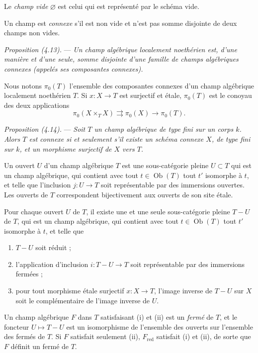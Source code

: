 \documentclass[10pt]{article}
\begin{document}
Le \emph{champ vide} $\varnothing$ est celui qui est représenté par le schéma vide.

Un champ est \emph{connexe} s'il est non vide et n'est pas somme disjointe de deux champs non vides.

\medskip
\noindent\emph{Proposition (4.13).} --- \emph{Un champ algébrique localement noethérien est, d'une manière et d'une seule, somme disjointe d'une famille de champs algébriques connexes (appelés ses composantes connexes).}

Nous notons $\pi_0(T)$ l'ensemble des composantes connexes d'un champ algébrique localement noethérien $T$. Si $x:X\to T$ est surjectif et étale, $\pi_0(T)$ est le conoyau des deux applications
\[
\pi_0(X\times_T X)\rightrightarrows \pi_0(X)\longrightarrow \pi_0(T).
\]

\medskip
\noindent\emph{Proposition (4.14).} --- \emph{Soit $T$ un champ algébrique de type fini sur un corps $k$. Alors $T$ est connexe si et seulement s'il existe un schéma connexe $X$, de type fini sur $k$, et un morphisme surjectif de $X$ vers $T$.}

Un ouvert $U$ d'un champ algébrique $T$ est une sous-catégorie pleine $U\subset T$ qui est un champ algébrique, qui contient avec tout $t\in\operatorname{Ob}(T)$ tout $t'$ isomorphe à $t$, et telle que l'inclusion $j:U\to T$ soit représentable par des immersions ouvertes. Les ouverts de $T$ correspondent bijectivement aux ouverts de son site étale.

Pour chaque ouvert $U$ de $T$, il existe une et une seule sous-catégorie pleine $T-U$ de $T$, qui est un champ algébrique, qui contient avec tout $t\in\operatorname{Ob}(T)$ tout $t'$ isomorphe à $t$, et telle que
\begin{enumerate}[label=(\roman*)]
\item $T-U$ soit réduit ;
\item l'application d'inclusion $i:T-U\to T$ soit représentable par des immersions fermées ;
\item pour tout morphisme étale surjectif $x:X\to T$, l'image inverse de $T-U$ sur $X$ soit le complémentaire de l'image inverse de $U$.
\end{enumerate}

Un champ algébrique $F$ dans $T$ satisfaisant (i) et (ii) est un \emph{fermé} de $T$, et le foncteur $U\mapsto T-U$ est un isomorphisme de l'ensemble des ouverts sur l'ensemble des fermés de $T$. Si $F$ satisfait seulement (ii), $F_{\mathrm{red}}$ satisfait (i) et (ii), de sorte que $F$ définit un fermé de $T$.
\end{document}
